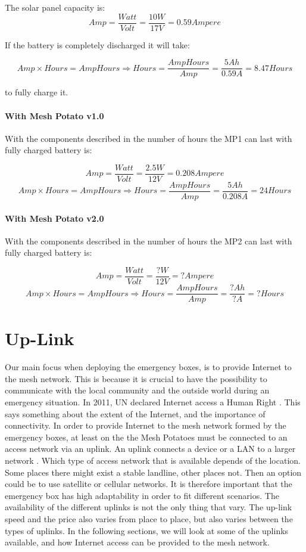 The solar panel capacity is:
$$Amp = \frac{Watt}{Volt} = \frac{10 W}{17 V} = 0.59 Ampere$$

If the battery is completely discharged it will take: 

$$Amp\times Hours = AmpHours \Rightarrow Hours =\frac{AmpHours}{Amp} = \frac{5 Ah}{0.59 A} = 8.47 Hours$$

to fully charge it. 

\paragraph{With Mesh Potato v1.0}
With the components described in  the number of hours the MP1 can last with fully charged battery is: 

$$Amp = \frac{Watt}{Volt} = \frac{2.5 W}{12 V} = 0.208 Ampere$$
$$Amp\times Hours = AmpHours \Rightarrow Hours = \frac{AmpHours}{Amp} = \frac{5 Ah}{0.208 A} = 24 Hours$$

\paragraph{With Mesh Potato v2.0}
With the components described in  the number of hours the MP2 can last with fully charged battery is: 

$$Amp = \frac{Watt}{Volt} = \frac{? W}{12 V} = ? Ampere$$
$$Amp\times Hours = AmpHours \Rightarrow Hours = \frac{AmpHours}{Amp} = \frac{? Ah}{? A} = ? Hours$$


\section{Up-Link}
Our main focus when deploying the emergency boxes, is to provide Internet to the mesh network. This is because it is crucial to have the possibility to communicate with the local community and the outside world during an emergency situation. In 2011, UN declared Internet access a Human Right \cite{HR}. This says something about the extent of the Internet, and the importance of connectivity. In order to provide Internet to the mesh network formed by the emergency boxes, at least on the the Mesh Potatoes must be connected to an access network via an uplink. An uplink connects a device or a LAN to a larger network \cite{uplink}. Which type of access network that is available depends of the location. Some places there might exist a stable landline, other places not. Then an option could be to use satellite or cellular networks. It is therefore important that the emergency box has high adaptability in order to fit different scenarios. The availability of the different uplinks is not the only thing that vary. The up-link speed and the price also varies from place to place, but also varies between the types of uplinks. In the following sections, we will look at some of the uplinks available, and how Internet access can be provided to the mesh network.  

